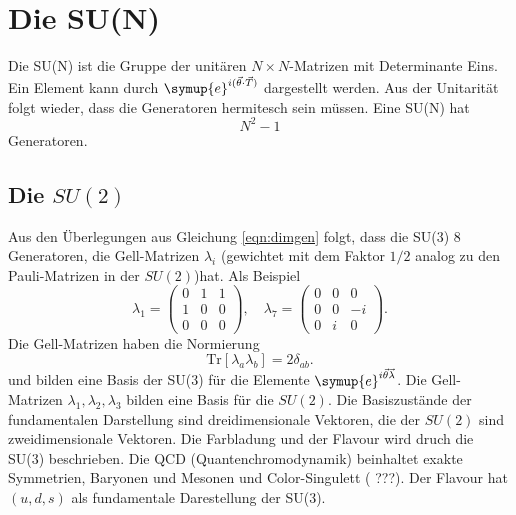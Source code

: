 \documentclass[
  captions=tableheading,  %
  titlepage=firstiscover, %
]{scrartcl}
\begin{document}
\section{Die SU(N)}
Die SU(N) ist die Gruppe der unitären $N \times N$-Matrizen mit Determinante Eins. 
Ein Element kann durch $\symup{e}^{i(\vec{\theta} \cdot \vec{{T}})}$ dargestellt werden.
Aus der Unitarität folgt wieder, dass die Generatoren hermitesch sein müssen.
Eine SU(N) hat
\begin{equation}
  N^2 - 1 \label{eqn:dimgen}
\end{equation}
Generatoren.
\subsection{Die \texorpdfstring{$SU(2)$}{PDFstring}}
Aus den Überlegungen aus Gleichung \eqref{eqn:dimgen} folgt, dass die 
SU(3) 8 Generatoren, die Gell-Matrizen $\lambda_i$ (gewichtet mit dem Faktor $1/2$ analog 
zu den Pauli-Matrizen in der $SU(2)$)hat.
Als Beispiel
\begin{equation*}
  \lambda_1 = 
  \begin{pmatrix}
    0 & 1 & 1 \\
    1 & 0 & 0 \\ 
    0 & 0 & 0 
  \end{pmatrix} ,\quad 
  \lambda_7 = 
  \begin{pmatrix}
    0 & 0 & 0 \\
    0 & 0 & -i\\
    0 & i & 0
  \end{pmatrix}.
\end{equation*}
Die Gell-Matrizen haben die Normierung 
\begin{equation*}
  \text{Tr}[\lambda_a \lambda_b] = 2 \delta_{ab} .
\end{equation*}
und bilden eine Basis der SU(3) für die Elemente $\symup{e}^{i \vec{\theta} \vec{\lambda}}$.
Die Gell-Matrizen $\lambda_1, \lambda_2, \lambda_3$ bilden eine Basis für 
die $SU(2)$.
Die Basiszustände der fundamentalen Darstellung sind dreidimensionale Vektoren, die der $SU(2)$ sind 
zweidimensionale Vektoren.
Die Farbladung und der Flavour wird druch die SU(3) beschrieben.
Die QCD (Quantenchromodynamik) beinhaltet exakte Symmetrien, Baryonen und Mesonen und Color-Singulett ({\color{red} ???}).
Der Flavour hat $(u, d, s)$ als fundamentale Darestellung der SU(3).
\end{document}
